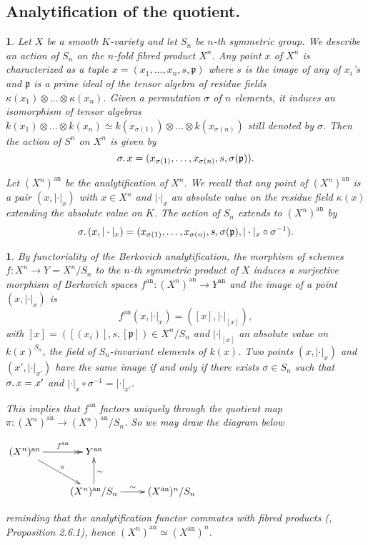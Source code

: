 \documentclass{amsart}%
\numberwithin{equation}{subsection}
\theoremstyle{plain2}
\theoremstyle{definition2}
\theoremstyle{stepstyle}
\theoremstyle{point}
\theoremstyle{subpoint}
\newtheorem{subpoint}[equation]{}%
\newcommand{\spa}[1]{\begin{subpoint}#1\end{subpoint}}           %
\newcommand{\fp}{\ensuremath{\mathfrak{p}}}
\newcommand{\an}{\mathrm{an}}
\begin{document}
\subsection{Analytification of the quotient.}
\spa{Let $X$ be a smooth $K$-variety and let $S_n$ be $n$-th symmetric group. We describe an action of $S_n$ on the $n$-fold fibred product $X^n$. Any point $x$ of $X^n$ is characterized as a tuple $x=(x_1,\ldots,x_n, s, \fp)$ where $s$ is the image of any of $x_i$'s and $\fp$ is a prime ideal of the tensor algebra of residue fields $\kappa(x_1) \otimes \ldots \otimes \kappa(x_n)$. Given  a permutation $\sigma$ of $n$ elements, it induces an isomorphism of tensor algebras  $k(x_1) \otimes \ldots \otimes k(x_n) \simeq  k(x_{\sigma(1)}) \otimes \ldots \otimes k(x_{\sigma(n)})$ still denoted by $\sigma$. Then the action of $S^n$ on $X^n$ is given by $$\sigma \ldotp x = (x_{\sigma(1)}, \ldots, x_{\sigma(n)}, s, \sigma(\fp)).$$

Let $(X^n)^{\an}$ be the analytification of $X^n$. We recall that any point of $(X^n)^{\an}$ is a pair $(x,|\cdot|_x)$ with $x \in X^n$ and $|\cdot|_x$ an absolute value on the residue field $\kappa(x)$ extending the absolute value on $K$. The action of $S_n$ extends to $(X^n)^\an$ by $$\sigma \ldotp (x,|\cdot|_x) = (x_{\sigma(1)}, \ldots, x_{\sigma(n)}, s, \sigma(\fp), |\cdot|_x \circ \sigma^{-1}).$$}

\spa{By functoriality of the Berkovich analytification, the morphism of schemes $f: X^n \rightarrow Y=X^n/S_n$ to the $n$-th symmetric product of $X$ induces a surjective morphism of Berkovich spaces $f^\an: (X^n)^\an \rightarrow Y^\an$ and the image of a point $(x,|\cdot|_x)$ is $$f^\an(x,|\cdot|_x)= ([x], |\cdot|_{[x]}),$$ with $[x]=([(x_i)],s,[\fp]) \in X^n/S_n$ and $|\cdot|_{[x]}$ an absolute value on $k(x)^{S_n}$, the field of $S_n$-invariant elements of $k(x)$. Two points $(x,|\cdot|_{x})$ and $(x',|\cdot|_{x'})$ have the same image if and only if there exists $\sigma \in S_n$ such that $\sigma \ldotp x = x'$ and $|\cdot|_x \circ \sigma^{-1}= |\cdot|_{x'}$.

This implies that $f^\an$ factors uniquely through the quotient map $\pi: (X^n)^\an \rightarrow (X^n)^\an/S_n$. So we may draw the diagram below \begin{center}
$\begin{gathered}
\xymatrix{ (X^n)^\an \ar[rd]^-{\pi} \ar@{->>}[r]^-{f^\an} & Y^\an & \\  & (X^n)^\an/S_n \ar[u]_{\sim} \ar[r]^{\sim}& (X^\an)^n/S_n \\
}
\end{gathered}$ \end{center} reminding that the analytification functor commutes with fibred products (\cite{Berkovich1993}, Proposition 2.6.1), hence $(X^n)^\an \simeq (X^\an)^n$.}
\end{document}
